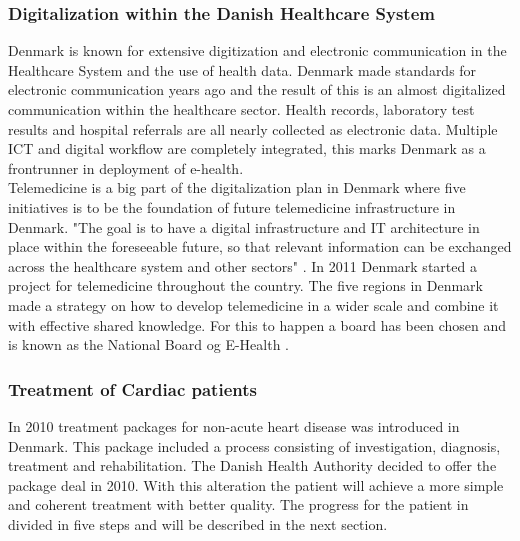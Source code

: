 \subsubsection{Digitalization within the Danish Healthcare System}

Denmark is known for extensive digitization and electronic communication in the Healthcare System and the use of health data. Denmark made standards for electronic communication years ago and the result of this is an almost digitalized communication within the healthcare sector. Health records, laboratory test results and hospital referrals are all nearly collected as electronic data. 
Multiple ICT and digital workflow are completely integrated, this marks Denmark as a frontrunner in deployment of e-health.\\
Telemedicine is a big part of the digitalization plan in Denmark where five initiatives is to be the foundation of future telemedicine infrastructure in Denmark. "The goal is to have a digital infrastructure and IT architecture in place within the foreseeable future, so that relevant information can be exchanged across the healthcare system and other sectors" \cite{Healthcareindk2}.
In 2011 Denmark started a project for telemedicine throughout the country. The five regions in Denmark made a strategy on how to develop telemedicine in a wider scale and combine it with effective shared knowledge. For this to happen a board has been chosen and is known as the National Board og E-Health \cite{DKhealthreview}. %



\subsubsection{Treatment of Cardiac patients}

In 2010 treatment packages for non-acute heart disease was introduced in Denmark. This package included a process consisting of investigation, diagnosis, treatment and rehabilitation. The Danish Health Authority decided to offer the package deal in 2010. With this alteration the patient will achieve a more simple and coherent treatment with better quality. 
The progress for the patient in divided in five steps and will be described in the next section. \\

